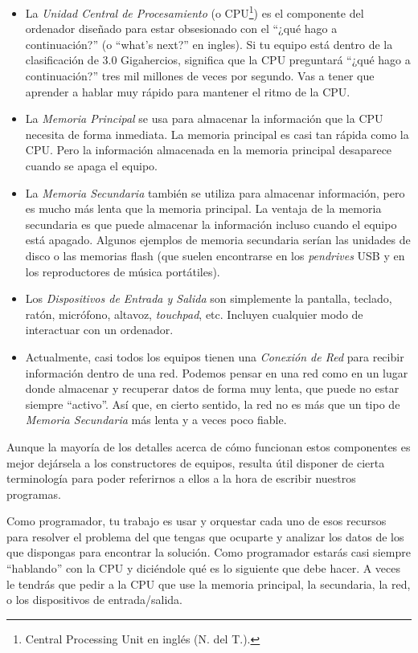 \begin{itemize}[nosep]
\item
  La \emph{Unidad Central de Procesamiento} (o
  CPU\footnote{Central Processing Unit en inglés
  (N. del T.).}) es el componente del ordenador diseñado para estar
  obsesionado con el ``¿qué hago a continuación?'' (o ``what's next?''
  en ingles). Si tu equipo está dentro de la clasificación de 3.0
  Gigahercios, significa que la CPU preguntará ``¿qué hago a
  continuación?'' tres mil millones de veces por segundo. Vas a tener
  que aprender a hablar muy rápido para mantener el ritmo de la CPU.
\item
  La \emph{Memoria Principal} se usa para almacenar la información que
  la CPU necesita de forma inmediata. La memoria principal es casi tan
  rápida como la CPU. Pero la información almacenada en la memoria
  principal desaparece cuando se apaga el equipo.
\item
  La \emph{Memoria Secundaria} también se utiliza para almacenar
  información, pero es mucho más lenta que la memoria principal. La
  ventaja de la memoria secundaria es que puede almacenar la información
  incluso cuando el equipo está apagado. Algunos ejemplos de memoria
  secundaria serían las unidades de disco o las memorias flash (que
  suelen encontrarse en los \emph{pendrives} USB y en los reproductores
  de música portátiles).
\item
  Los \emph{Dispositivos de Entrada y Salida} son simplemente la
  pantalla, teclado, ratón, micrófono, altavoz, \emph{touchpad}, etc.
  Incluyen cualquier modo de interactuar con un ordenador.
\item
  Actualmente, casi todos los equipos tienen una \emph{Conexión de Red}
  para recibir información dentro de una red. Podemos pensar en una red
  como en un lugar donde almacenar y recuperar datos de forma muy lenta,
  que puede no estar siempre ``activo''. Así que, en cierto sentido, la
  red no es más que un tipo de \emph{Memoria Secundaria} más lenta y a
  veces poco fiable.
\end{itemize}

Aunque la mayoría de los detalles acerca de cómo funcionan estos
componentes es mejor dejársela a los constructores de equipos, resulta
útil disponer de cierta terminología para poder referirnos a ellos a la
hora de escribir nuestros programas.

Como programador, tu trabajo es usar y orquestar cada uno de esos
recursos para resolver el problema del que tengas que ocuparte y
analizar los datos de los que dispongas para encontrar la solución. Como
programador estarás casi siempre ``hablando'' con la CPU y diciéndole
qué es lo siguiente que debe hacer. A veces le tendrás que pedir a la
CPU que use la memoria principal, la secundaria, la red, o los
dispositivos de entrada/salida.

